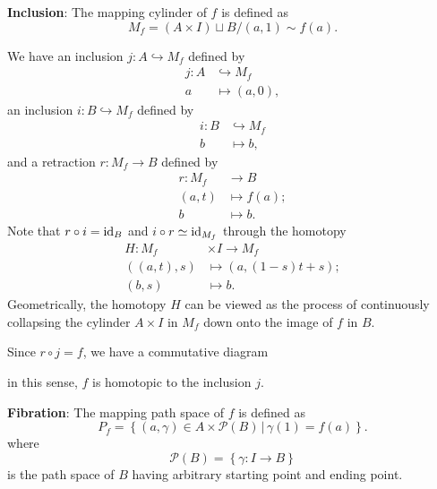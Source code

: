     \textbf{Inclusion}:
    The mapping cylinder of $f$ is defined as
    \begin{equation*}
        M_f = (A\times I)\sqcup B\big/(a,1)\sim f(a).
    \end{equation*}
    
    We have an inclusion $j: A\hookrightarrow M_f$ defined by 
    \begin{align*}
        j:A&\hookrightarrow M_f \\
        a &\mapsto(a,0),
    \end{align*}
    an inclusion $i: B\hookrightarrow M_f$ defined by
    \begin{align*}
        i:B&\hookrightarrow M_f \\
        b &\mapsto b,
    \end{align*}
    and a retraction $r: M_f \to B$ defined by
    \begin{align*}
        r:M_f&\to B \\
        (a,t) &\mapsto f(a); \\
        b &\mapsto b.
    \end{align*}
    Note that $r\circ i = {\rm id}_B$ and $i\circ r \simeq {\rm id}_{M_f}$ 
    through the homotopy
    \begin{align*}
        H: M_f &\times I \to M_f \\
        ((a,t),s) &\mapsto (a,(1-s)t+s); \\
        (b,s) &\mapsto b. 
    \end{align*}
    Geometrically, the homotopy $H$ can be viewed as 
    the process of continuously collapsing 
    the cylinder $A\times I$ in $M_f$ down onto 
    the image of $f$ in $B$.

    Since $r\circ j = f$, we have a commutative diagram
    \begin{center}
    \end{center}
    in this sense, $f$ is homotopic to the inclusion $j$.

    \textbf{Fibration}:
    The mapping path space of $f$ is defined as
    \begin{equation*}
        P_f =\left\{(a,\gamma) \in A\times\mathcal{P}(B)\,\Big|\,
        \gamma(1) = f(a)\right\}.
    \end{equation*}
    where
    \begin{equation*}
        \mathcal{P}(B) = \left\{\gamma: I\to B\right\}
    \end{equation*}
    is the path space of $B$ having arbitrary starting point 
    and ending point.
    
